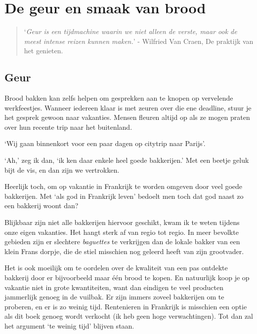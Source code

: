 \documentclass[
  11pt,
  dutch,
]{memoir}
\begin{document}
\hypertarget{de-geur-en-smaak-van-brood}{%
\chapter{De geur en smaak van brood}\label{de-geur-en-smaak-van-brood}}

\begin{quote}
`\emph{Geur is een tijdmachine waarin we niet alleen de verste, maar ook
de meest intense reizen kunnen maken.}' - Wilfried Van Craen, De
praktijk van het genieten.
\end{quote}

\hypertarget{geur}{%
\section{Geur}\label{geur}}

Brood bakken kan zelfs helpen om gesprekken aan te knopen op vervelende
werkfeestjes. Wanneer iedereen klaar is met zeuren over die ene
deadline, stuur je het gesprek gewoon naar vakanties. Mensen fleuren
altijd op als ze mogen praten over hun recente trip naar het buitenland.

`Wij gaan binnenkort voor een paar dagen op citytrip naar Parijs'.

`Ah,' zeg ik dan, `ik ken daar enkele heel goede bakkerijen.' Met een
beetje geluk bijt de vis, en dan zijn we vertrokken.

Heerlijk toch, om op vakantie in Frankrijk te worden omgeven door veel
goede bakkerijen. Met `als god in Frankrijk leven' bedoelt men toch dat
god naast zo een bakkerij woont dan?

Blijkbaar zijn niet alle bakkerijen hiervoor geschikt, kwam ik te weten
tijdens onze eigen vakanties. Het hangt sterk af van regio tot regio. In
meer bevolkte gebieden zijn er slechtere \emph{baguettes} te verkrijgen
dan de lokale bakker van een klein Frans dorpje, die de stiel misschien
nog geleerd heeft van zijn grootvader.

Het is ook moeilijk om te oordelen over de kwaliteit van een pas
ontdekte bakkerij door er bijvoorbeeld maar één brood te kopen. En
natuurlijk koop je op vakantie niet in grote kwantiteiten, want dan
eindigen te veel producten jammerlijk genoeg in de vuilbak. Er zijn
immers zoveel bakkerijen om te proberen, en er is zo weinig tijd.
Rentenieren in Frankrijk is misschien een optie als dit boek genoeg
wordt verkocht (ik heb geen hoge verwachtingen). Tot dan zal het
argument `te weinig tijd' blijven staan.
\end{document}
